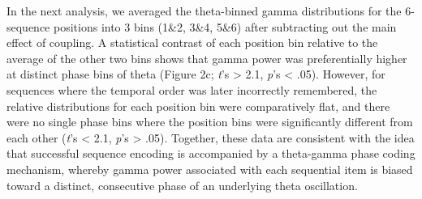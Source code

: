 In the next analysis, we averaged the theta-binned gamma distributions
for the 6-sequence positions into 3 bins (1\&2, 3\&4, 5\&6) after
subtracting out the main effect of coupling. A statistical contrast of
each position bin relative to the average of the other two bins shows
that gamma power was preferentially higher at distinct phase bins of
theta (Figure 2c; \emph{t}'s \textgreater{} 2.1, \emph{p}'s \textless{}
.05). However, for sequences where the temporal order was later
incorrectly remembered, the relative distributions for each position bin
were comparatively flat, and there were no single phase bins where the
position bins were significantly different from each other (\emph{t}'s
\textless{} 2.1, \emph{p}'s \textgreater{} .05). Together, these data
are consistent with the idea that successful sequence encoding is
accompanied by a theta-gamma phase coding mechanism, whereby gamma power
associated with each sequential item is biased toward a distinct,
consecutive phase of an underlying theta oscillation.

